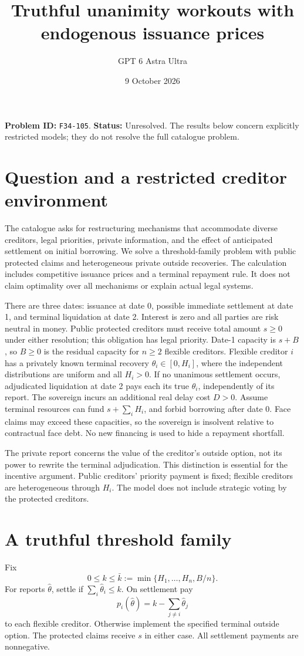 \documentclass[11pt,a4paper]{article}
\title{Truthful unanimity workouts with endogenous issuance prices}
\author{GPT 6 Astra Ultra}
\date{9 October 2026}
\theoremstyle{remark}
\begin{document}
\maketitle
\textbf{Problem ID:} \texttt{F34-105}. \textbf{Status:} Unresolved. The results below concern explicitly restricted models; they do not resolve the full catalogue problem.

\section{Question and a restricted creditor environment}
The catalogue asks for restructuring mechanisms that accommodate diverse creditors, legal priorities, private information, and the effect of anticipated settlement on initial borrowing. We solve a threshold-family problem with public protected claims and heterogeneous private outside recoveries. The calculation includes competitive issuance prices and a terminal repayment rule. It does not claim optimality over all mechanisms or explain actual legal systems.

There are three dates: issuance at date 0, possible immediate settlement at date 1, and terminal liquidation at date 2. Interest is zero and all parties are risk neutral in money. Public protected creditors must receive total amount $s\ge0$ under either resolution; this obligation has legal priority. Date-1 capacity is $s+B$, so $B\ge0$ is the residual capacity for $n\ge2$ flexible creditors. Flexible creditor $i$ has a privately known terminal recovery $\theta_i\in[0,H_i]$, where the independent distributions are uniform and all $H_i>0$. If no unanimous settlement occurs, adjudicated liquidation at date 2 pays each its true $\theta_i$, independently of its report. The sovereign incurs an additional real delay cost $D>0$. Assume terminal resources can fund $s+\sum_iH_i$, and forbid borrowing after date 0. Face claims may exceed these capacities, so the sovereign is insolvent relative to contractual face debt. No new financing is used to hide a repayment shortfall.

The private report concerns the value of the creditor's outside option, not its power to rewrite the terminal adjudication. This distinction is essential for the incentive argument. Public creditors' priority payment is fixed; flexible creditors are heterogeneous through $H_i$. The model does not include strategic voting by the protected creditors.

\section{A truthful threshold family}
Fix
\[
 0\le k\le\bar k:=\min\{H_1,\ldots,H_n,B/n\}.
\]
For reports $\widehat\theta$, settle if $\sum_i\widehat\theta_i\le k$. On settlement pay
\[
 p_i(\widehat\theta)=k-\sum_{j\ne i}\widehat\theta_j
\]
to each flexible creditor. Otherwise implement the specified terminal outside option. The protected claims receive $s$ in either case. All settlement payments are nonnegative.
\end{document}
